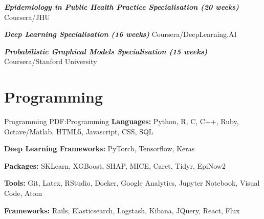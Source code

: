 \documentclass[letterpaper,10pt,oneside]{article}
\begin{document}
\begin{body}
\textbf{\textit{Epidemiology in Public Health Practice Specialisation (20 weeks)}} Coursera/JHU 
\hfill
{}

\textbf{\textit{Deep Learning Specialisation (16 weeks)}} Coursera/DeepLearning.AI 
\hfill
{}

\textbf{\textit{Probabilistic Graphical Models Specialisation (15 weeks)}} Coursera/Stanford University 
\hfill
{}


\section
{Programming}
{Programming}
{PDF:Programming}
\textbf{Languages:} Python, R, C, C++, Ruby, Octave/Matlab, HTML5, Javascript, CSS, SQL

\textbf{Deep Learning Frameworks:}  PyTorch, Tensorflow, Keras

\textbf{Packages:} SKLearn, XGBoost, SHAP, MICE, Caret, Tidyr, EpiNow2

\textbf{Tools:} Git, Latex, RStudio, Docker, Google Analytics, Jupyter Notebook, Visual Code, Atom

\textbf{Frameworks:} Rails, Elasticsearch, Logstash, Kibana, JQuery, React, Flux
\end{body}


\label{LastPage}~
\end{document}
